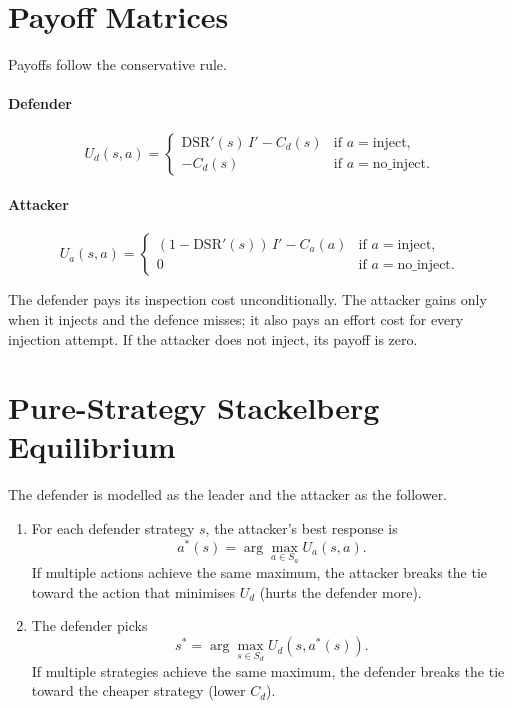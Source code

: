\documentclass[12pt, a4paper]{report}
\begin{document}
\section{Payoff Matrices}

Payoffs follow the conservative rule.

\paragraph{Defender}
\[
U_d(s, a) =
\begin{cases}
\mathrm{DSR}'(s) \, I' - C_d(s) & \text{if } a = \text{inject}, \\
-C_d(s) & \text{if } a = \text{no\_inject}.
\end{cases}
\]

\paragraph{Attacker}
\[
U_a(s, a) =
\begin{cases}
(1 - \mathrm{DSR}'(s)) \, I' - C_a(a) & \text{if } a = \text{inject}, \\
0 & \text{if } a = \text{no\_inject}.
\end{cases}
\]

The defender pays its inspection cost unconditionally. The attacker
gains only when it injects and the defence misses; it also pays an
effort cost for every injection attempt. If the attacker does not
inject, its payoff is zero.

\section{Pure-Strategy Stackelberg Equilibrium}

The defender is modelled as the leader and the attacker as the
follower.

\begin{enumerate}
    \item For each defender strategy $s$, the attacker's best response
          is
          \[
          a^*(s) = \arg\max_{a \in S_a} U_a(s, a).
          \]
          If multiple actions achieve the same maximum, the attacker
          breaks the tie toward the action that minimises $U_d$
          (hurts the defender more).
    \item The defender picks
          \[
          s^* = \arg\max_{s \in S_d} U_d(s, a^*(s)).
          \]
          If multiple strategies achieve the same maximum, the defender
          breaks the tie toward the cheaper strategy (lower $C_d$).
\end{enumerate}
\end{document}
